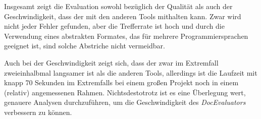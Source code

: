 Insgesamt zeigt die Evaluation sowohl bezüglich der Qualität als auch der Geschwindigkeit, dass der \doceval mit den anderen Tools mithalten kann. Zwar wird nicht jeder Fehler gefunden, aber die Trefferrate ist hoch und durch die Verwendung eines abstrakten Formates, das für mehrere Programmiersprachen geeignet ist, sind solche Abstriche nicht vermeidbar. 

Auch bei der Geschwindigkeit zeigt sich, dass der \doceval zwar im Extremfall zweieinhalbmal langsamer ist als die anderen Tools, allerdings ist die Laufzeit mit knapp 70 Sekunden im Extremfalls bei einem großen Projekt noch in einem (relativ) angemessenen Rahmen. Nichtsdestotrotz ist es eine Überlegung wert, genauere Analysen durchzuführen, um die Geschwindigkeit des \textit{DocEvaluators} verbessern zu können. 